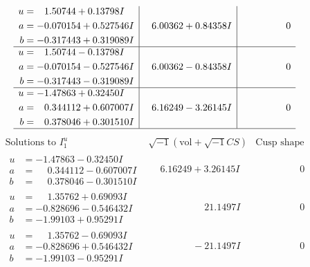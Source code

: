 \documentclass[1p]{elsarticle_modified}
\theoremstyle{definition}
\newcommand{\I}{\sqrt{-1}}
\begin{document}
$$\begin{array}{c|c|c}
\begin{aligned}
u &= \phantom{-}1.50744 + 0.13798 I \\
a &= -0.070154 + 0.527546 I \\
b &= -0.317443 + 0.319089 I\end{aligned}
 & \phantom{-}6.00362 + 0.84358 I & \phantom{-0.000000 } 0 \\ \hline\begin{aligned}
u &= \phantom{-}1.50744 - 0.13798 I \\
a &= -0.070154 - 0.527546 I \\
b &= -0.317443 - 0.319089 I\end{aligned}
 & \phantom{-}6.00362 - 0.84358 I & \phantom{-0.000000 } 0 \\ \hline\begin{aligned}
u &= -1.47863 + 0.32450 I \\
a &= \phantom{-}0.344112 + 0.607007 I \\
b &= \phantom{-}0.378046 + 0.301510 I\end{aligned}
 & \phantom{-}6.16249 - 3.26145 I & \phantom{-0.000000 } 0\\
 \hline 
 \end{array}$$\newpage$$\begin{array}{c|c|c}  
\text{Solutions to }I^u_{1}& \I (\text{vol} + \sqrt{-1}CS) & \text{Cusp shape}\\
 \hline 
\begin{aligned}
u &= -1.47863 - 0.32450 I \\
a &= \phantom{-}0.344112 - 0.607007 I \\
b &= \phantom{-}0.378046 - 0.301510 I\end{aligned}
 & \phantom{-}6.16249 + 3.26145 I & \phantom{-0.000000 } 0 \\ \hline\begin{aligned}
u &= \phantom{-}1.35762 + 0.69093 I \\
a &= -0.828696 - 0.546432 I \\
b &= -1.99103 + 0.95291 I\end{aligned}
 & \phantom{-0.000000 -}21.1497 I & \phantom{-0.000000 } 0 \\ \hline\begin{aligned}
u &= \phantom{-}1.35762 - 0.69093 I \\
a &= -0.828696 + 0.546432 I \\
b &= -1.99103 - 0.95291 I\end{aligned}
 & \phantom{-0.000000 } -21.1497 I & \phantom{-0.000000 } 0 \\ \hline\begin{aligned}

\end{aligned}
\end{array}$$
\end{document}
